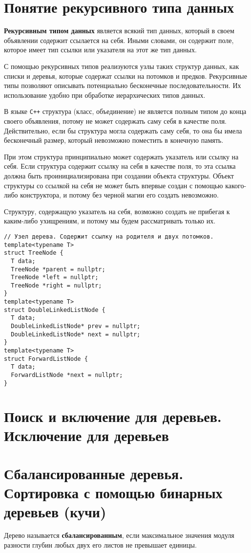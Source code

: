 \section{Понятие рекурсивного типа данных}
\textbf{Рекурсивным типом данных} является всякий тип данных, который в своем объявлении содержит ссылается
на себя. Иными словами, он содержит поле, которое имеет тип ссылки или указателя на этот же тип данных.

С помощью рекурсивных типов реализуются узлы таких структур данных, как списки и деревья, которые
содержат ссылки на потомков и предков. Рекурсивные типы позволяют описывать потенциально бесконечные
последовательности. Их использование удобно при обработке иерархических типов данных.

В языке \verb|C++| структура (класс, объединение) не является полным типом до конца
своего объявления, потому не может содержать саму себя в качестве поля. Действительно, если бы структура
могла содержать саму себя, то она бы имела бесконечный размер, который невозможно поместить в конечную память.

При этом структура принципиально может содержать указатель или ссылку на себя. Если структура содержит ссылку на себя
в качестве поля, то эта ссылка должна быть проинициализирована при создании объекта структуры. Объект структуры со
ссылкой на себя не может быть впервые создан с помощью какого-либо конструктора, и потому без черной магии его
создать невозможно.

Структуру, содержащую указатель на себя, возможно создать не прибегая к каким-либо ухищрениям,
и потому мы будем рассматривать только их.

\begin{verbatim}
// Узел дерева. Содержит ссылку на родителя и двух потомков.
template<typename T>
struct TreeNode {
  T data;
  TreeNode *parent = nullptr;
  TreeNode *left = nullptr;
  TreeNode *right = nullptr;
}
template<typename T>
struct DoubleLinkedListNode {
  T data;
  DoubleLinkedListNode* prev = nullptr;
  DoubleLinkedListNode* next = nullptr;
}
template<typename T>
struct ForwardListNode {
  T data;
  ForwardListNode *next = nullptr;
}
\end{verbatim}

\section{Поиск и включение для деревьев. Исключение для деревьев}
\label{sec:tree-node-ops}
\section{Сбалансированные деревья. Сортировка с помощью бинарных деревьев (кучи)}
Дерево называется \textbf{сбалансированным}, если максимальное значения модуля разности глубин
любых двух его листов не превышает единицы.

